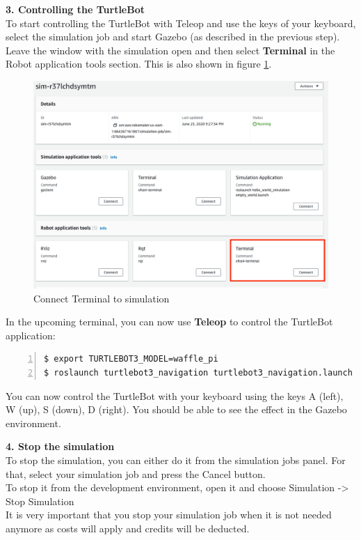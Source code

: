 \documentclass[plainarticle,zihtitle,english,final,hyperref,utf8]{zihpub}
\begin{document}
\newpage
\textbf{3. Controlling the TurtleBot}\\
\newline
To start controlling the TurtleBot with Teleop and use the keys of your keyboard, select the simulation job and start Gazebo (as described in the previous step). Leave the window with the simulation open and then select \textbf{Terminal} in the Robot application tools section.
This is also shown in figure \ref{fig:connectTerminalAWS}.\\
\begin{figure}[h!]
  \begin{center}
    \includegraphics[width=.85\textwidth]{terminal_aws_connect.png}
    \caption{Connect Terminal to simulation}
    \label{fig:connectTerminalAWS}
  \end{center}
\end{figure}

In the upcoming terminal, you can now use \textbf{Teleop} to control the TurtleBot application:\\
\begin{Verbatim}[breaklines=true, breakanywhere=true, baselinestretch=1,fontsize=\scriptsize,numbers=left,frame=single,stepnumber=5,xleftmargin=1cm,xrightmargin=1cm]
$ export TURTLEBOT3_MODEL=waffle_pi
$ roslaunch turtlebot3_navigation turtlebot3_navigation.launch map_file:=$HOME/map.yaml

\end{Verbatim}
You can now control the TurtleBot with your keyboard using the keys A (left), W (up), S (down), D (right). You should be able to see the effect in the Gazebo environment.
\newline

\textbf{4. Stop the simulation}\\
\newline
To stop the simulation, you can either do it from the simulation jobs panel. For that, select your simulation job and press the Cancel button.\\
To stop it from the development environment, open it and choose Simulation -> Stop Simulation\\
\newline
It is very important that you stop your simulation job when it is not needed anymore as costs will apply and credits will be deducted.\\
\end{document}
